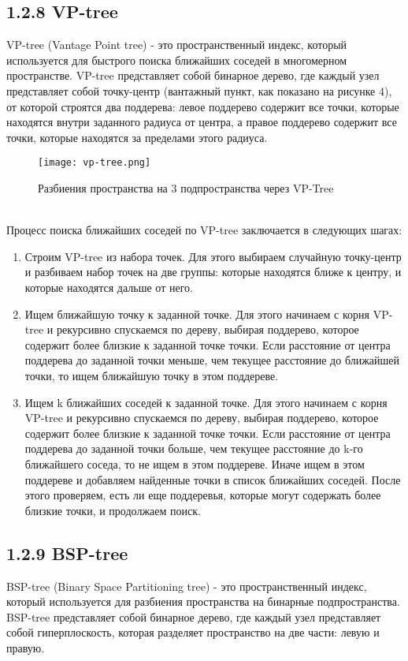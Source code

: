 \subsection{1.2.8 VP-tree}
VP-tree (Vantage Point tree) - это пространственный индекс, который используется для быстрого поиска ближайших соседей в многомерном пространстве. VP-tree представляет собой бинарное дерево, где каждый узел представляет собой точку-центр (вантажный пункт, как показано на рисунке 4), от которой строятся два поддерева: левое поддерево содержит все точки, которые находятся внутри заданного радиуса от центра, а правое поддерево содержит все точки, которые находятся за пределами этого радиуса.
  \\
\begin{figure}[h]
    \centering
    \texttt{[image: vp-tree.png]}
    \caption{Разбиения пространства на 3 подпространства через VP-Tree}
\end{figure}
  \\
Процесс поиска ближайших соседей по VP-tree заключается в следующих шагах:

\begin{enumerate}
    \item Строим VP-tree из набора точек. Для этого выбираем случайную точку-центр и разбиваем набор точек на две группы: которые находятся ближе к центру, и которые находятся дальше от него.
    \item Ищем ближайшую точку к заданной точке. Для этого начинаем с корня VP-tree и рекурсивно спускаемся по дереву, выбирая поддерево, которое содержит более близкие к заданной точке точки. Если расстояние от центра поддерева до заданной точки меньше, чем текущее расстояние до ближайшей точки, то ищем ближайшую точку в этом поддереве.
    \item Ищем k ближайших соседей к заданной точке. Для этого начинаем с корня VP-tree и рекурсивно спускаемся по дереву, выбирая поддерево, которое содержит более близкие к заданной точке точки. Если расстояние от центра поддерева до заданной точки больше, чем текущее расстояние до k-го ближайшего соседа, то не ищем в этом поддереве. Иначе ищем в этом поддереве и добавляем найденные точки в список ближайших соседей. После этого проверяем, есть ли еще поддеревья, которые могут содержать более близкие точки, и продолжаем поиск.
\end{enumerate}


\subsection{1.2.9 BSP-tree}
BSP-tree (Binary Space Partitioning tree) - это пространственный индекс, который используется для разбиения пространства на бинарные подпространства\cite{liuGBTree}. BSP-tree представляет собой бинарное дерево, где каждый узел представляет собой гиперплоскость, которая разделяет пространство на две части: левую и правую.

